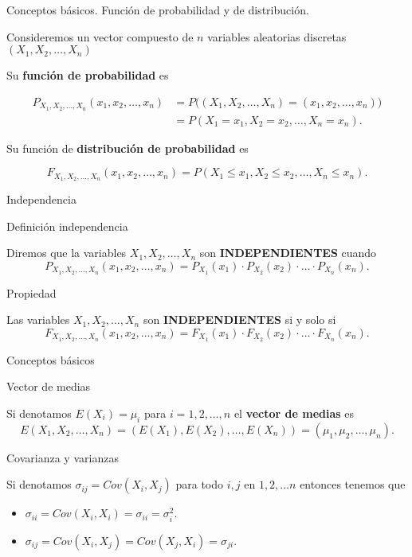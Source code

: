\documentclass[ignorenonframetext,]{beamer}
\providecommand{\tightlist}{%
  \setlength{\itemsep}{0pt}\setlength{\parskip}{0pt}}
\begin{document}
\begin{frame}{Conceptos básicos. Función de probabilidad y de
distribución.}
\protect\hypertarget{conceptos-buxe1sicos.-funciuxf3n-de-probabilidad-y-de-distribuciuxf3n.}{}

Consideremos un vector compuesto de \(n\) variables aleatorias discretas
\((X_1,X_2,\ldots,X_n)\)

Su \textbf{función de probabilidad} es

\[\begin{aligned} P_{X_1,X_2,\ldots, X_n}(x_1,x_2,\ldots,x_n) &= P\Big((X_1,X_2,\ldots,X_n)=(x_1,x_2,\ldots,x_n)\Big)\\
&=P(X_1=x_1,X_2=x_2,\ldots,X_n=x_n).\end{aligned}\]

Su función de \textbf{distribución de probabilidad} es

\[F_{X_1,X_2,\ldots, X_n}(x_1,x_2,\ldots,x_n)=P(X_1\leq x_1,X_2\leq x_2,\ldots,X_n\leq x_n).\]

\end{frame}

\begin{frame}{Independencia}
\protect\hypertarget{independencia}{}

Definición independencia

Diremos que la variables \(X_1,X_2,\ldots, X_n\) son
\textbf{INDEPENDIENTES} cuando
\[P_{X_1,X_2,\ldots, X_n}(x_1,x_2,\ldots,x_n) =P_{X_1}(x_1)\cdot P_{X_2}(x_2)\cdot  \ldots \cdot  P_{X_n}(x_n).\]

Propiedad

Las variables \(X_1,X_2,\ldots, X_n\) son \textbf{INDEPENDIENTES} si y
solo si
\[F_{X_1,X_2,\ldots, X_n}(x_1,x_2,\ldots,x_n)=F_{X_1}(x_1)\cdot F_{X_2}(x_2)\cdot  \ldots \cdot  F_{X_n}(x_n).\]

\end{frame}

\begin{frame}{Conceptos básicos}
\protect\hypertarget{conceptos-buxe1sicos}{}

 Vector de medias

Si denotamos \(E(X_i)=\mu_i\) para \(i=1,2,\ldots,n\) el \textbf{vector
de medias} es
\[E(X_1,X_2,\ldots,X_n)=(E(X_1),E(X_2),\ldots,E(X_n))=(\mu_1,\mu_2,\ldots,\mu_n).\]

 Covarianza y varianzas

Si denotamos \(\sigma_{ij}=Cov(X_i,X_j)\) para todo \(i,j\) en
\(1,2,\ldots n\) entonces tenemos que

\begin{itemize}
\tightlist
\item
  \(\sigma_{ii}=Cov(X_i,X_i)=\sigma_{ii}=\sigma_i^2.\)
\item
  \(\sigma_{ij}=Cov(X_i,X_j)=Cov(X_j,X_i)=\sigma_{ji}.\)
\end{itemize}

\end{frame}
\end{document}
